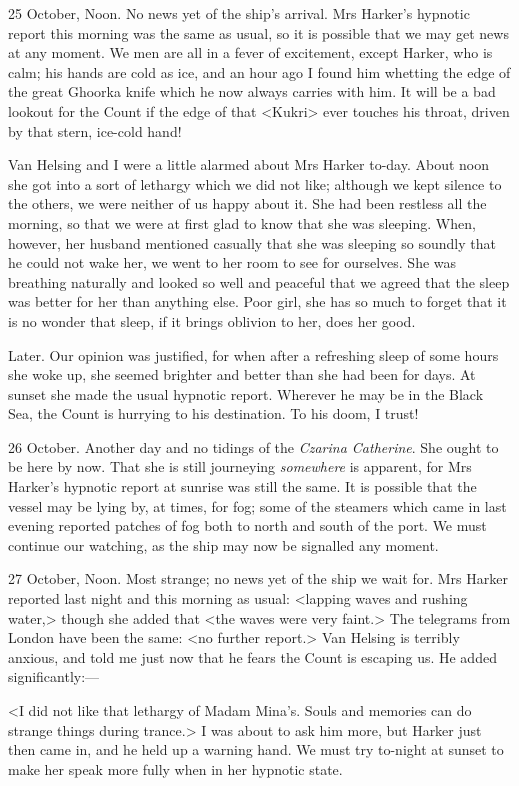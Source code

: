 \begin{diary}{25 October, Noon.}
No news yet of the ship's arrival. Mrs Harker's hypnotic report this morning was the same as usual, so it is possible that we may get news at any moment. We men are all in a fever of excitement, except Harker, who is calm; his hands are cold as ice, and an hour ago I found him whetting the edge of the great Ghoorka knife which he now always carries with him. It will be a bad lookout for the Count if the edge of that <Kukri> ever touches his throat, driven by that stern, ice-cold hand!

Van Helsing and I were a little alarmed about Mrs Harker to-day. About noon she got into a sort of lethargy which we did not like; although we kept silence to the others, we were neither of us happy about it. She had been restless all the morning, so that we were at first glad to know that she was sleeping. When, however, her husband mentioned casually that she was sleeping so soundly that he could not wake her, we went to her room to see for ourselves. She was breathing naturally and looked so well and peaceful that we agreed that the sleep was better for her than anything else. Poor girl, she has so much to forget that it is no wonder that sleep, if it brings oblivion to her, does her good.
\end{diary}
 

\begin{diary}{Later.}
Our opinion was justified, for when after a refreshing sleep of some hours she woke up, she seemed brighter and better than she had been for days. At sunset she made the usual hypnotic report. Wherever he may be in the Black Sea, the Count is hurrying to his destination. To his doom, I trust!
\end{diary}
 

\begin{diary}{26 October.}
Another day and no tidings of the \textit{Czarina Catherine}. She ought to be here by now. That she is still journeying \textit{somewhere} is apparent, for Mrs Harker's hypnotic report at sunrise was still the same. It is possible that the vessel may be lying by, at times, for fog; some of the steamers which came in last evening reported patches of fog both to north and south of the port. We must continue our watching, as the ship may now be signalled any moment.
\end{diary}
 

\begin{diary}{27 October, Noon.}
Most strange; no news yet of the ship we wait for. Mrs Harker reported last night and this morning as usual: <lapping waves and rushing water,> though she added that <the waves were very faint.> The telegrams from London have been the same: <no further report.> Van Helsing is terribly anxious, and told me just now that he fears the Count is escaping us. He added significantly:—

<I did not like that lethargy of Madam Mina's. Souls and memories can do strange things during trance.> I was about to ask him more, but Harker just then came in, and he held up a warning hand. We must try to-night at sunset to make her speak more fully when in her hypnotic state.
\end{diary}
 

